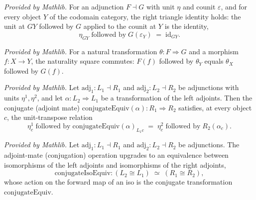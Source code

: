 \begin{lemma}
  \label{lem:right_triangle_components_mathlib}
  \mathlibok
  \textit{Provided by Mathlib.}
  For an adjunction \(F \dashv G\) with unit \(\eta\) and counit \(\varepsilon\), and
  for every object \(Y\) of the codomain category, the right triangle identity holds:
  the unit at \(G Y\) followed by \(G\) applied to the counit at \(Y\) is the identity,
  \[
    \eta_{G Y} \;\text{followed by}\; G(\varepsilon_Y) \;=\; \mathrm{id}_{G Y}.
  \]
\end{lemma}

\begin{lemma}
  \label{lem:natTrans_naturality_mathlib}
  \mathlibok
  \textit{Provided by Mathlib.}
  For a natural transformation \(\theta : F \Rightarrow G\) and a morphism
  \(f : X \to Y\), the naturality square commutes: \(F(f)\) followed by \(\theta_Y\)
  equals \(\theta_X\) followed by \(G(f)\).
\end{lemma}

\begin{lemma}
  \label{lem:unit_conjugateEquiv_mathlib}
  \mathlibok
  \textit{Provided by Mathlib.}
  Let \(\mathrm{adj}_1 : L_1 \dashv R_1\) and \(\mathrm{adj}_2 : L_2 \dashv R_2\) be
  adjunctions with units \(\eta^1, \eta^2\), and let \(\alpha : L_2 \Rightarrow L_1\)
  be a transformation of the left adjoints. Then the conjugate (adjoint mate)
  \(\mathrm{conjugateEquiv}(\alpha) : R_1 \Rightarrow R_2\) satisfies, at every object
  \(c\), the unit-transpose relation
  \[
    \eta^1_c \;\text{followed by}\; \mathrm{conjugateEquiv}(\alpha)_{L_1 c}
    \;=\; \eta^2_c \;\text{followed by}\; R_2(\alpha_c).
  \]
\end{lemma}

\begin{lemma}
  \label{lem:conjugateIsoEquiv_mathlib}
  \mathlibok
  \textit{Provided by Mathlib.}
  Let \(\mathrm{adj}_1 : L_1 \dashv R_1\) and \(\mathrm{adj}_2 : L_2 \dashv R_2\) be adjunctions. The
  adjoint-mate (conjugation) operation upgrades to an equivalence between isomorphisms of the left
  adjoints and isomorphisms of the right adjoints,
  \[
    \mathrm{conjugateIsoEquiv} : (L_2 \cong L_1) \;\simeq\; (R_1 \cong R_2),
  \]
  whose action on the forward map of an iso is the conjugate transformation \(\mathrm{conjugateEquiv}\).
\end{lemma}

